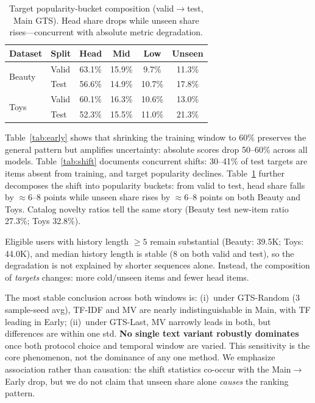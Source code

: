 \documentclass[sigconf,natbib=true,anonymous]{acmart}
\newcommand{\tfidf}{\textsc{TF-IDF}\xspace}
\begin{document}
\begin{table}[t]
\centering
\caption{%
Target popularity-bucket composition (valid$\to$test, Main GTS).
Head share drops while unseen share rises---concurrent with absolute metric degradation.%
}
\label{tab:bucket}
\small
\setlength{\tabcolsep}{3.5pt}
\begin{tabular}{@{}llcccc@{}}
\toprule
Dataset & Split & Head & Mid & Low & Unseen \\
\midrule
\multirow{2}{*}{Beauty}
 & Valid & 63.1\% & 15.9\% & 9.7\% & 11.3\% \\
 & Test  & 56.6\% & 14.9\% & 10.7\% & 17.8\% \\
\midrule
\multirow{2}{*}{Toys}
 & Valid & 60.1\% & 16.3\% & 10.6\% & 13.0\% \\
 & Test  & 52.3\% & 15.5\% & 11.0\% & 21.3\% \\
\bottomrule
\end{tabular}
\end{table}

Table~\ref{tab:early} shows that shrinking the training window to 60\% preserves the general pattern but amplifies uncertainty: absolute scores drop 50--60\% across all models.
Table~\ref{tab:shift} documents concurrent shifts: 30--41\% of test targets are items absent from training, and target popularity declines.
Table~\ref{tab:bucket} further decomposes the shift into popularity buckets: from valid to test, head share falls by $\approx$6--8 points while unseen share rises by $\approx$6--8 points on both Beauty and Toys.
Catalog novelty ratios tell the same story (Beauty test new-item ratio 27.3\%; Toys 32.8\%).

Eligible users with history length $\ge 5$ remain substantial (Beauty: 39.5K; Toys: 44.0K), and median history length is stable (8 on both valid and test), so the degradation is not explained by shorter sequences alone.
Instead, the composition of \emph{targets} changes: more cold/unseen items and fewer head items.

The most stable conclusion across both windows is:
(i)~under GTS-Random (3 sample-seed avg), \tfidf and MV are nearly indistinguishable in Main, with TF leading in Early;
(ii)~under GTS-Last, MV narrowly leads in both, but differences are within one std.
\textbf{No single text variant robustly dominates} once both protocol choice and temporal window are varied.
This sensitivity is the core phenomenon, not the dominance of any one method.
We emphasize association rather than causation: the shift statistics co-occur with the Main$\to$Early drop, but we do not claim that unseen share alone \emph{causes} the ranking pattern.
\end{document}
